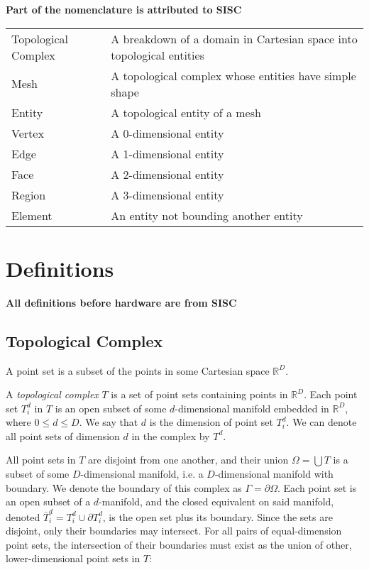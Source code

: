 {\bf Part of the nomenclature is attributed to SISC}

\begin{tabular}{l|l}
Topological Complex & A breakdown of a domain in Cartesian space into
topological entities \\
Mesh & A topological complex whose entities have simple shape \\
Entity & A topological entity of a mesh \\
Vertex & A 0-dimensional entity \\
Edge & A 1-dimensional entity \\
Face & A 2-dimensional entity \\
Region & A 3-dimensional entity \\
Element & An entity not bounding another entity \\
\end{tabular}

\section{Definitions}

{\bf All definitions before hardware are from SISC}

\subsection{Topological Complex}

A point set is a subset of the points in some Cartesian
space $\mathbb{R}^D$.

A {\it topological complex} $T$ is a set of point sets
containing points in $\mathbb{R}^D$.
Each point set $T^d_i$ in $T$ is an open subset of some
$d$-dimensional manifold embedded in $\mathbb{R}^D$,
where $0\leq d \leq D$.
We say that $d$ is the dimension of point set $T^d_i$.
We can denote all point sets of dimension $d$ in the
complex by $T^d$.

All point sets in $T$ are disjoint from one another,
and their union $\Omega = \bigcup T$ is a subset of some $D$-dimensional
manifold, i.e. a $D$-dimensional manifold with boundary.
We denote the boundary of this complex as $\Gamma = \partial\Omega$.
Each point set is an open subset of a $d$-manifold,
and the closed equivalent on said manifold,
denoted $\bar{T}^d_i = T^d_i \cup \partial T^d_i$,
is the open set plus its boundary.
Since the sets are disjoint, only their boundaries may intersect.
For all pairs of equal-dimension point sets, the intersection
of their boundaries must exist as the union of other,
lower-dimensional point sets in $T$:

